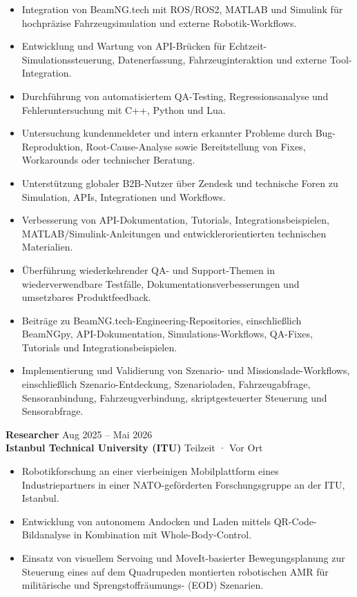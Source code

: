 \documentclass[11pt,a4paper]{article}
\begin{document}
\begin{itemize}
    \item Integration von BeamNG.tech mit ROS/ROS2, MATLAB und Simulink für hochpräzise Fahrzeugsimulation und externe Robotik-Workflows.
    \item Entwicklung und Wartung von API-Brücken für Echtzeit-Simulationssteuerung, Datenerfassung, Fahrzeuginteraktion und externe Tool-Integration.
    \item Durchführung von automatisiertem QA-Testing, Regressionsanalyse und Fehleruntersuchung mit C++, Python und Lua.
    \item Untersuchung kundenmeldeter und intern erkannter Probleme durch Bug-Reproduktion, Root-Cause-Analyse sowie Bereitstellung von Fixes, Workarounds oder technischer Beratung.
    \item Unterstützung globaler B2B-Nutzer über Zendesk und technische Foren zu Simulation, APIs, Integrationen und Workflows.
    \item Verbesserung von API-Dokumentation, Tutorials, Integrationsbeispielen, MATLAB/Simulink-Anleitungen und entwicklerorientierten technischen Materialien.
    \item Überführung wiederkehrender QA- und Support-Themen in wiederverwendbare Testfälle, Dokumentationsverbesserungen und umsetzbares Produktfeedback.
    \item Beiträge zu BeamNG.tech-Engineering-Repositories, einschließlich BeamNGpy, API-Dokumentation, Simulations-Workflows, QA-Fixes, Tutorials und Integrationsbeispielen.
    \item Implementierung und Validierung von Szenario- und Missionslade-Workflows, einschließlich Szenario-Entdeckung, Szenarioladen, Fahrzeugabfrage, Sensoranbindung, Fahrzeugverbindung, skriptgesteuerter Steuerung und Sensorabfrage.
\end{itemize}

\textbf{Researcher} \hfill Aug 2025 -- Mai 2026\\
\textbf{Istanbul Technical University (ITU)} \hfill Teilzeit · Vor Ort

\begin{itemize}
    \item Robotikforschung an einer vierbeinigen Mobilplattform eines Industriepartners in einer NATO-geförderten Forschungsgruppe an der ITU, Istanbul.
    \item Entwicklung von autonomem Andocken und Laden mittels QR-Code-Bildanalyse in Kombination mit Whole-Body-Control.
    \item Einsatz von visuellem Servoing und MoveIt-basierter Bewegungsplanung zur Steuerung eines auf dem Quadrupeden montierten robotischen AMR für militärische und Sprengstoffräumungs- (EOD) Szenarien.
\end{itemize}
\end{document}
